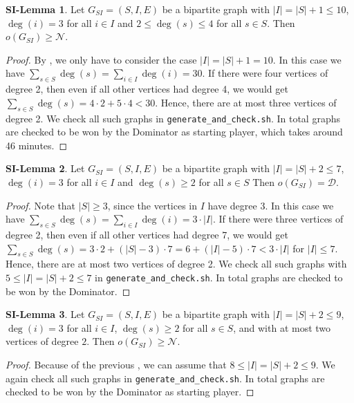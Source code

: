 \documentclass[a4paper,11pt,oneside]{scrartcl}
\theoremstyle{definition}
\newtheorem{si-lemma}{SI-Lemma}
\theoremstyle{remark}
\begin{document}
\begin{si-lemma}\label{si-lemma:S9I10}
    Let $G_{SI}=(S,I,E)$ be a bipartite graph with $|I| = |S|+ 1 \leq 10$, $\deg(i)=3$ for all $i\in I$ and $2 \leq \deg(s) \leq 4$ for all $s\in S$. Then $o(G_{SI})\geq  \mathcal N$. 
\end{si-lemma}
\begin{proof}
    By , we only have to consider the case $|I| = |S|+ 1 = 10$.
    In this case we have $\sum_{s\in S} \deg(s) = \sum_{i\in I} \deg(i) = 30$. If there were four vertices of degree 2,  then even if all other vertices had degree 4, we would get $\sum_{s\in S} \deg(s) = 4\cdot 2 + 5\cdot 4 < 30$. Hence, there are at most three vertices of degree 2.
    We check all such graphs in \texttt{generate\_and\_check.sh}.
    In total  graphs are checked to be won by the Dominator as starting player, which takes around 46 minutes.
\end{proof}

\begin{si-lemma}\label{si-lemma:S5I7_i=s+2}
    Let $G_{SI}=(S,I,E)$ be a bipartite graph with $|I| = |S|+ 2 \leq 7$, $\deg(i)=3$ for all $i\in I$ and  $\deg(s) \geq 2$ for all $s\in S$ Then $o(G_{SI})= \mathcal D$. 
\end{si-lemma}
\begin{proof}
    Note that $|S| \geq 3$, since the vertices in $I$ have degree $3$. In this case we have $\sum_{s\in S} \deg(s) = \sum_{i\in I} \deg(i) = 3\cdot|I|$. If there were three vertices of degree 2, then even if all other vertices had degree 7, we would get $\sum_{s\in S} \deg(s) = 3\cdot 2 + (|S|-3)\cdot 7 =  6+ (|I|-5)\cdot 7 < 3\cdot|I|$ for $|I|\leq 7$. Hence, there are at most two vertices of degree 2. We check all such graphs with $5 \leq |I| = |S|+ 2 \leq 7$ in \texttt{generate\_and\_check.sh}.
    In total  graphs are checked to be won by the Dominator.
\end{proof}

\begin{si-lemma}\label{si-lemma:S7I9_i=s+2}
    Let $G_{SI}=(S,I,E)$ be a bipartite graph with $|I| = |S|+ 2 \leq 9$, $\deg(i)=3$ for all $i\in I$, $\deg(s) \geq 2$ for all $s\in S$, and with at most two vertices of degree $2$. Then $o(G_{SI})\geq \mathcal N$. 
\end{si-lemma}
\begin{proof}
    Because of the previous , we can assume that $8 \leq |I| = |S|+ 2 \leq 9$. We again check all such graphs in \texttt{generate\_and\_check.sh}.
    In total  graphs are checked to be won by the Dominator as starting player.
\end{proof}
\end{document}

